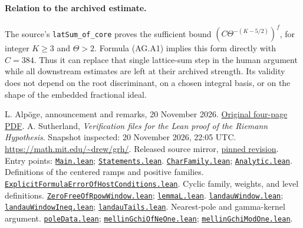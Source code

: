 \documentclass[11pt,a4paper]{article}
\numberwithin{equation}{section}
\theoremstyle{remark}\newtheorem{remark}[theorem]{Remark}
\newcommand{\src}[2]{\href{https://github.com/CocoSgt/riemann-hypothesis-lean/blob/7cbf7a0c32fca1badf05931879a37c3f8a2b03b4/src/#1}{\texttt{#2}}}
\begin{document}
\paragraph{Relation to the archived estimate.}
The source's \texttt{latSum\_of\_core} proves the sufficient
bound \((C\Theta^{-(K-5/2)})^f\), for integer \(K\ge3\)
and \(\Theta>2\).  Formula (AG.A1) implies this form directly
with \(C=384\).  Thus it can replace that single lattice-sum
step in the human argument while all downstream estimates are
left at their archived strength.  Its validity does not depend
on the root discriminant, on a chosen integral basis, or on the
shape of the embedded fractional ideal.


\begin{thebibliography}{99}\small\raggedright
{} L. Alp\"oge, announcement and remarks, 20 November 2026. \href{https://alpo.ge/remark.pdf}{Original four-page PDF}.
 A. Sutherland, \emph{Verification files for the Lean proof of the Riemann Hypothesis}. Snapshot inspected: 20 November 2026, 22:05 UTC. \url{https://math.mit.edu/~drew/grh/}.
 Released source mirror, \href{https://github.com/CocoSgt/riemann-hypothesis-lean/tree/7cbf7a0c32fca1badf05931879a37c3f8a2b03b4}{pinned revision}. Entry points: \src{Main.lean}{Main.lean}; \src{Statements.lean}{Statements.lean}.
 \src{Development/AutomorphicArithmetic/DedekindLFunctions/CharFamily.lean}{CharFamily.lean}; \src{Formalism/SharpRestriction/RamificationFrobenius/TotientGaloisClasses/Analytic.lean}{Analytic.lean}. Definitions of the centered ramps and positive families.
 \src{Formalism/SharpRestriction/RamificationFrobenius/TotientGaloisClasses/ExplicitFormulaErrorOfHostConditions.lean}{ExplicitFormulaErrorOfHostConditions.lean}. Cyclic family, weights, and level definitions.
 \src{Development/AutomorphicArithmetic/DedekindLFunctions/LandauTheorems/ZeroFreeOfRpowWindow.lean}{ZeroFreeOfRpowWindow.lean}; \src{Development/AutomorphicArithmetic/DedekindLFunctions/LandauTheorems/lemmaL.lean}{lemmaL.lean}.
 \src{Development/AutomorphicArithmetic/DedekindLFunctions/LandauTheorems/landauWindow.lean}{landauWindow.lean}; \src{Development/AutomorphicArithmetic/DedekindLFunctions/LandauTheorems/landauWindowIneq.lean}{landauWindowIneq.lean}; \src{Development/AutomorphicArithmetic/DedekindLFunctions/LandauTheorems/landauTails.lean}{landauTails.lean}. Nearest-pole and gamma-kernel argument.
 \src{Development/AutomorphicArithmetic/DedekindLFunctions/LandauTheorems/poleData.lean}{poleData.lean}; \src{Development/AutomorphicArithmetic/DedekindLFunctions/LandauTheorems/mellinGchiOfNeOne.lean}{mellinGchiOfNeOne.lean}; \src{Development/AutomorphicArithmetic/DedekindLFunctions/LandauTheorems/mellinGchiModOne.lean}{mellinGchiModOne.lean}.

\end{thebibliography}
\end{document}
